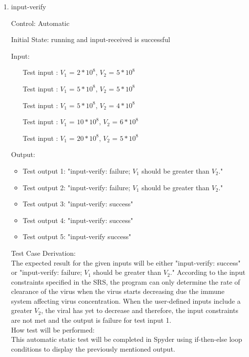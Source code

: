 \documentclass[12pt, titlepage]{article}
\newcounter{tinnum} %
\begin{document}
\begin{enumerate}
					
\item{input-verify\\}

Control: Automatic
					
Initial State: \progname{} running and input-received is successful
					
Input:
\begin{itemize} %
\item[Test input \refstepcounter{tinnum}\thetinnum\label{Tinput_7}:] $V_1$ = 
$2*10^8$, $V_2$ = $5*10^8$ %
\item[Test input \refstepcounter{tinnum}\thetinnum\label{Tinput_8}:]$V_1$ = 
$5*10^8$, $V_2$ = $5*10^8$%
\item[Test input \refstepcounter{tinnum}\thetinnum\label{Tinput_9}:] $V_1$ = 
$5*10^8$, $V_2$ = $4*10^8$%
\item[Test input \refstepcounter{tinnum}\thetinnum\label{Tinput_10}:]$V_1$ = 
$10*10^8$, $V_2$ = $6*10^8$%
\item[Test input \refstepcounter{tinnum}\thetinnum\label{Tinput_11}:]$V_1$ = 
$20*10^8$, $V_2$ = $5*10^8$%

\end{itemize}

Output: 
\begin{itemize}
\item Test output 1: "input-verify: failure; $V_1$ should be greater than 
$V_2$."
\item Test output 2: "input-verify: failure; $V_1$ should be greater than 
$V_2$." 
\item Test output 3: "input-verify: success"
\item Test output 4: "input-verify: success"
\item Test output 5: "input-verify success"
\end{itemize}

Test Case Derivation:\\
The expected result for the given inputs will be either "input-verify: success" 
or  "input-verify: failure; $V_1$ should be greater than $V_2$." According to 
the input constraints specified in the SRS, the program can only determine the 
rate of clearance of the virus when the virus starts decreasing due the immune 
system affecting virus concentration. When the user-defined inputs include a 
greater $V_2$, the viral has yet to decrease and therefore, the input 
constraints are not met and the output is failure for test input 1.\\

How test will be performed: \\
This automatic static test will be completed in Spyder using if-then-else loop 
conditions to display the previously mentioned output. \\

\end{enumerate}
					
\end{document}
